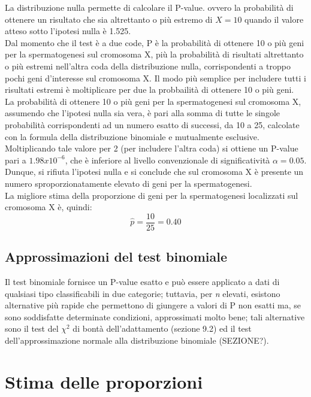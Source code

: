 \documentclass[drafts, 10pt]{book}
\newcounter{example}[section]
\begin{document}
\begin{example}
    La distribuzione nulla permette di calcolare il P-value. ovvero la probabilità di ottenere un risultato che sia altrettanto o più estremo di $X = 10$ quando il valore atteso sotto l'ipotesi nulla è 1.525.
    \\
    Dal momento che il test è a due code, P è la probabilità di ottenere 10 o più geni per la spermatogenesi sul cromosoma X, più la probabilità di risultati altrettanto o più estremi nell'altra coda della distribuzione nulla, corrispondenti a troppo pochi geni d'interesse sul cromosoma X. Il modo più semplice per includere tutti i risultati estremi è moltiplicare per due la probbailità di ottenere 10 o più geni.
    \\
    La probabilità di ottenere 10 o più geni per la spermatogenesi sul cromosoma X, assumendo che l'ipotesi nulla sia vera, è pari alla somma di tutte le singole probabilità corrispondenti ad un numero esatto di successi, da 10 a 25, calcolate con la formula della distribuzione binomiale e mutualmente esclusive. Moltiplicando tale valore per 2 (per includere l'altra coda) si ottiene un P-value pari a $1.98 x 10^{-6}$, che è inferiore al livello convenzionale di significatività $\alpha = 0.05$. Dunque, si rifiuta l'ipotesi nulla e si conclude che sul cromosoma X è presente un numero sproporzionatamente elevato di geni per la spermatogenesi.
    \\
    La migliore stima della proporzione di geni per la spermatogenesi localizzati sul cromosoma X è, quindi:
    \begin{equation}
    \hat{p} = \frac{10}{25} = 0.40
    \end{equation}
\end{example}

\subsection{Approssimazioni del test binomiale}
Il test binomiale fornisce un P-value esatto e può essere applicato a dati di qualsiasi tipo classificabili in due categorie; tuttavia, per \textit{n} elevati, esistono alternative più rapide che permettono di giungere a valori di P non esatti ma, se sono soddisfatte determinate condizioni, approssimati molto bene; tali alternative sono il test del $\chi^2$ di bontà dell'adattamento (sezione 9.2) ed il test dell'approssimazione normale alla distribuzione binomiale (SEZIONE?).

\section{Stima delle proporzioni}
\end{document}

